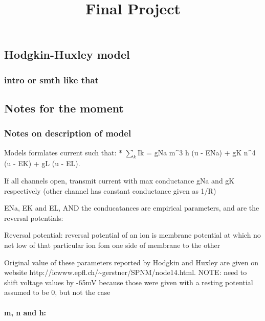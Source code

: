 \documentclass[11pt]{article}
\title{Final Project }
\begin{document}
    
    
    \maketitle
    
    

    
    \subsection{Hodgkin-Huxley model}\label{hodgkin-huxley-model}

\subsubsection{intro or smth like that}\label{intro-or-smth-like-that}

\subsection{Notes for the moment}\label{notes-for-the-moment}

\subsubsection{Notes on description of
model}\label{notes-on-description-of-model}

Models formlates current such that: * \(\displaystyle \sum_{k}^{}\)Ik =
gNa m\^{}3 h (u - ENa) + gK n\^{}4 (u - EK) + gL (u - EL).

If all channels open, transmit current with max conductance gNa and gK
respectively (other channel has constant conductance given as 1/R)

ENa, EK and EL, AND the conducatances are empirical parameters, and are
the reversal potentials:

Reversal potential: reversal potential of an ion is membrane potential
at which no net low of that particular ion fom one side of membrane to
the other

Original value of these parameters reported by Hodgkin and Huxley are
given on website
http://icwww.epfl.ch/\textasciitilde{}gerstner/SPNM/node14.html. NOTE:
need to shift voltage values by -65mV because those were given with a
resting potential assumed to be 0, but not the case

\paragraph{m, n and h:}\label{m-n-and-h}
\end{document}
